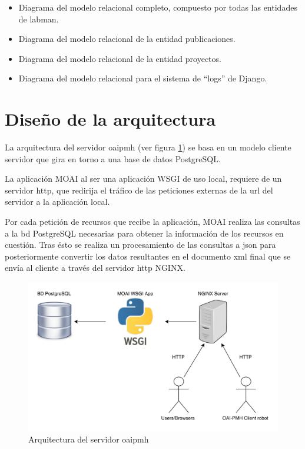 \begin{itemize}
	\item Diagrama del modelo relacional completo, compuesto por todas las entidades de \acrshort{labman}.
	\item Diagrama del modelo relacional de la entidad publicaciones.
	\item Diagrama del modelo relacional de la entidad proyectos.
	\item Diagrama del modelo relacional para el sistema de ``logs'' de Django.
\end{itemize}

\section{Diseño de la arquitectura}

La arquitectura del servidor \acrshort{oaipmh} (ver figura \ref{fig:oai_architecture}) se basa en un modelo cliente servidor que gira en torno a una base de datos PostgreSQL.

La aplicación MOAI al ser una aplicación WSGI de uso local, requiere de un servidor \acrshort{http}, que redirija el tráfico de las peticiones externas de la \acrshort{url} del servidor a la aplicación local.

Por cada petición de recursos que recibe la aplicación, MOAI realiza las consultas a la \acrshort{bd} PostgreSQL necesarias para obtener la información de los recursos en cuestión. Tras ésto se realiza un procesamiento de las consultas a \acrfull{json}\cite{JSON} para posteriormente convertir los datos resultantes en el documento \acrshort{xml} final que se envía al cliente a través del servidor \acrshort{http} NGINX\cite{NGINX}.

\begin{figure}[!htbp]
	\centering
	\includegraphics[scale=1]{fig/architecture/oai_achitecture}
	\caption{Arquitectura del servidor \acrshort{oaipmh}}
	\label{fig:oai_architecture}
\end{figure}

